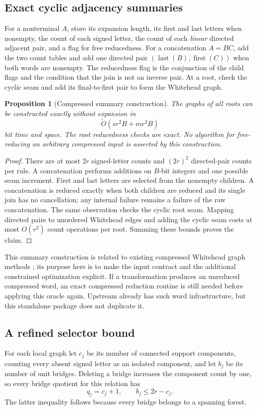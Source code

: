\documentclass[11pt,letterpaper]{article}
\newtheorem{proposition}[theorem]{Proposition}
\theoremstyle{definition}\newtheorem{definition}[theorem]{Definition}
\begin{document}
\subsection{Exact cyclic adjacency summaries}
For a nonterminal $A$, store its expansion length, its first and last letters when nonempty, the count of each signed letter, the count of each \emph{linear} directed adjacent pair, and a flag for free reducedness. For a concatenation $A=BC$, add the two count tables and add one directed pair $(\operatorname{last}(B),\operatorname{first}(C))$ when both words are nonempty. The reducedness flag is the conjunction of the child flags and the condition that the join is not an inverse pair. At a root, check the cyclic seam and add its final-to-first pair to form the Whitehead graph.

\begin{proposition}[Compressed summary construction]\label{prop:slp}
The graphs of all roots can be constructed exactly without expansion in
\[
 \widetilde O(sr^2B+mr^2B)
\]
bit time and space. The root reducedness checks are exact. No algorithm for \emph{free-reducing an arbitrary compressed input} is asserted by this construction.
\end{proposition}
\begin{proof}
There are at most $2r$ signed-letter counts and $(2r)^2$ directed-pair counts per rule. A concatenation performs additions on $B$-bit integers and one possible seam increment. First and last letters are selected from the nonempty children. A concatenation is reduced exactly when both children are reduced and its single join has no cancellation; any internal failure remains a failure of the raw concatenation. The same observation checks the cyclic root seam. Mapping directed pairs to unordered Whitehead edges and adding the cyclic seam costs at most $O(r^2)$ count operations per root. Summing these bounds proves the claim.
\end{proof}

This summary construction is related to existing compressed Whitehead graph methods \cite{kapovich}; its purpose here is to make the input contract and the additional constrained optimization explicit. If a transformation produces an unreduced compressed word, an exact compressed reduction routine is still needed before applying this oracle again. Upstream already has such word infrastructure, but this standalone package does not duplicate it.

\subsection{A refined selector bound}
For each local graph let $c_j$ be its number of connected support components, counting every absent signed letter as an isolated component, and let $b_j$ be its number of unit bridges. Deleting a bridge increases the component count by one, so every bridge quotient for this relation has
\[
 q_j=c_j+1,\qquad b_j\le2r-c_j.
\]
The latter inequality follows because every bridge belongs to a spanning forest.
\end{document}
